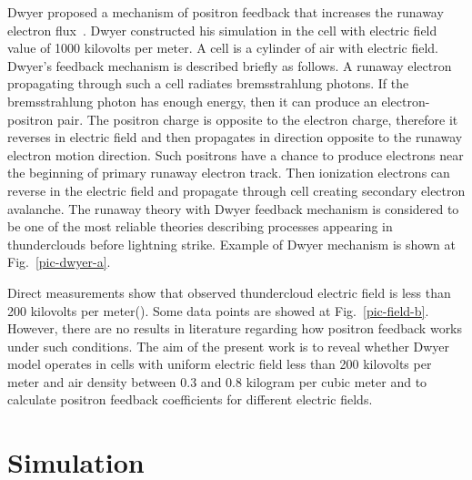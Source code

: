 \documentclass[utf8]{webofc}
\begin{document}
    Dwyer proposed a mechanism of positron feedback that increases the runaway electron flux~\cite{dwyer2003fundamental}. Dwyer constructed his simulation in the cell with electric field value of 1000 kilovolts per meter. A cell is a cylinder of air with electric field. Dwyer’s feedback mechanism is described briefly as follows. A runaway electron propagating through such a cell radiates bremsstrahlung photons. If the bremsstrahlung photon has enough energy, then it can produce an electron-positron pair. The positron charge is opposite to the electron charge, therefore it reverses in electric field and then propagates in direction opposite to the runaway electron motion direction. Such positrons have a chance to produce electrons near the beginning of primary runaway electron track. Then ionization electrons can reverse in the electric field and propagate through cell creating secondary electron avalanche. The runaway theory with Dwyer feedback mechanism is considered to be one of the most reliable theories describing processes appearing in thunderclouds before lightning strike. Example of Dwyer mechanism is shown at Fig.~\ref{pic-dwyer-a}.
    
    Direct measurements show that observed thundercloud electric field is less than 200 kilovolts per  meter(\cite{mazin1989clouds, marshall1995electric}). Some data points are showed at Fig.~\ref{pic-field-b}. However, there are no results in literature regarding how positron feedback works under such conditions. The aim of the present work is to reveal whether Dwyer model operates in cells with uniform electric field less than 200 kilovolts per meter and air density between 0.3 and 0.8 kilogram per cubic meter and to calculate positron feedback coefficients for different electric fields. %
    \section{Simulation}
    
\end{document}
